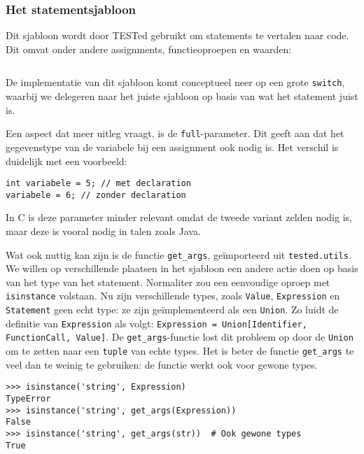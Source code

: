 \inputminted{mako}{sources/c-selector.mako}

\subsubsection{Het statementsjabloon}

Dit sjabloon wordt door TESTed gebruikt om statements te vertalen naar code.
Dit omvat onder andere assignments, functieoproepen en waarden:

\inputminted{mako}{sources/c-statement.mako}

De implementatie van dit sjabloon komt conceptueel neer op een grote \texttt{switch}, waarbij we delegeren naar het juiste sjabloon op basis van wat het statement juist is.

Een aspect dat meer uitleg vraagt, is de \texttt{full}-parameter.
Dit geeft aan dat het gegevenstype van de variabele bij een assignment ook nodig is.
Het verschil is duidelijk met een voorbeeld:

\begin{verbatim}
int variabele = 5; // met declaration
variabele = 6; // zonder declaration
\end{verbatim}

In C is deze parameter minder relevant omdat de tweede variant zelden nodig is, maar deze is vooral nodig in talen zoals Java.

Wat ook nuttig kan zijn is de functie \texttt{get\_args}, geïmporteerd uit \texttt{tested.utils}.
We willen op verschillende plaatsen in het sjabloon een andere actie doen op basis van het type van het statement.
Normaliter zou een eenvoudige oproep met \texttt{isinstance} volstaan.
Nu zijn verschillende types, zoals \texttt{Value}, \texttt{Expression} en \texttt{Statement} geen echt type: ze zijn geïmplementeerd als een \texttt{Union}.
Zo luidt de definitie van \texttt{Expression} als volgt: \texttt{Expression = Union[Identifier, FunctionCall, Value]}.
De \texttt{get\_args}-functie lost dit probleem op door de \texttt{Union} om te zetten naar een \texttt{tuple} van echte types.
Het is beter de functie \texttt{get\_args} te veel dan te weinig te gebruiken: de functie werkt ook voor gewone types.

\begin{verbatim}
>>> isinstance('string', Expression)
TypeError
>>> isinstance('string', get_args(Expression))
False
>>> isinstance('string', get_args(str))  # Ook gewone types
True
\end{verbatim}

